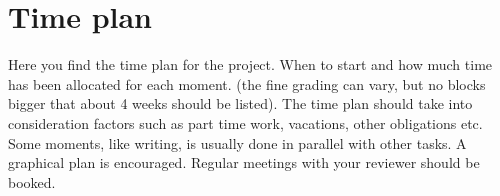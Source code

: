 \documentclass[a4paper,11pt]{article}
\begin{document}
\section{Time plan}

Here you find the time plan for the project. When to start and how much time has been allocated for each moment. (the fine grading can vary, but no blocks bigger that about 4 weeks should be listed). The time plan should take into consideration factors such as part time work, vacations, other obligations etc. Some moments, like writing, is usually done in parallel with other tasks. A graphical plan is encouraged. Regular meetings with your reviewer should be booked.

\cite{DUMMY}


\printbibliography[heading=bibintoc]
\end{document}
